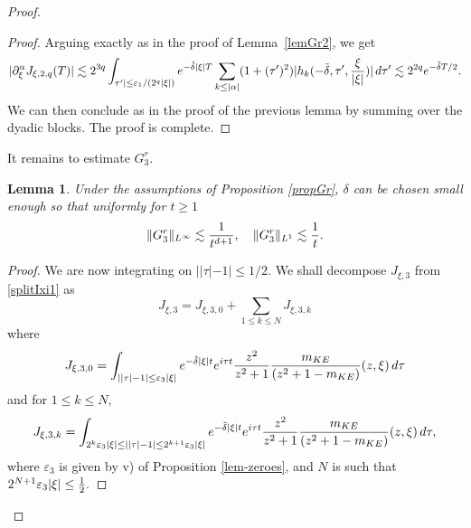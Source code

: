 \documentclass[11pt]{amsart}
\numberwithin{equation}{section}
\newtheorem{lem}{Lemma}[section]
\newcommand{\eps}{\varepsilon}
\begin{document}
\begin{proof}
\begin{proof}
Arguing exactly as in the proof of Lemma~\ref{lemGr2}, we get
   \begin{equation*}  | \partial_{\xi}^\alpha J_{\xi, 2, q}(T) | \lesssim  2^{3 q} \int_{  \tau' | \leq \eps_{1}/( 2^q | \xi|) } e^{-  \tilde \delta |\xi| T} 
         \sum_{k \leq | \alpha |} ( 1 + (\tau')^2) | h_{k} ( - \tilde \delta,  \tau',  
     {\xi \over |\xi| } )  |\, d\tau'  \lesssim   2^{2 q}  e^{- \tilde \delta T/2}.  
      \end{equation*}
      We can then conclude as in the proof of the previous lemma by summing over the dyadic blocks.
The proof is complete.  
    \end{proof} 
    
   It  remains to estimate $G_{3}^r.$
   \begin{lem}
   \label{lemGr3}
     Under the assumptions of Proposition \ref{propGr},  $\delta$ can be chosen small enough so that  uniformly for $t \geq 1$
    $$ \| G^r_{3} \|_{L^\infty} \lesssim {1 \over t^{d+1}}, \quad   \| G^r_{3} \|_{L^1} \lesssim {1 \over t }.$$
   \end{lem}
   \begin{proof}
We are now integrating on $| |\tau |- 1 | \leq 1/2$. We shall decompose $J_{\xi,3}$ from \eqref{splitIxi1} as
   $$ J_{\xi, 3} = J_{\xi, 3, 0} + \sum_{ 1\leq k \leq N} J_{\xi, 3, k}$$
   where 
 $$ J_{\xi, 3, 0} =  \int_{ || \tau|- 1 | \leq \eps_{3} | \xi|}  e^{- \tilde \delta | \xi | t }  e^{i \tau t }
 {z^2 \over z^2+1} { m_{KE} \over (z^2+ 1 - m_{KE})}(z, \xi)
  \, d\tau$$
  and for $1 \leq k\leq N$, 
 $$ J_{\xi, 3, k} = \int_{  2^{k} \eps_{3} |\xi| \leq | | \tau|- 1 | \leq 2^{k+1} \eps_{3} | \xi|}  e^{- \tilde \delta | \xi | t }  e^{i \tau t }
 {z^2 \over z^2+1} { m_{KE} \over (z^2+ 1 - m_{KE})}(z, \xi)
  \, d\tau,$$
  where $\eps_{3}$ is given by v) of Proposition \ref{lem-zeroes}, and $N$ is such that
   $ 2^{N+1} \eps_{3}| \xi| \leq  {1 \over 2}.$
  

\end{proof}
\end{proof}
\end{document}
